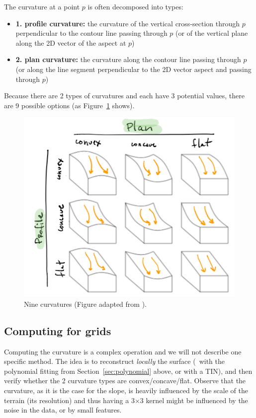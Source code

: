 The curvature at a point $p$ is often decomposed into types:
\begin{itemize}
  \item \textbf{1. profile curvature:} the curvature of the vertical cross-section through $p$ perpendicular to the contour line passing through $p$ (or of the vertical plane along the 2D vector of the aspect at $p$)
  \item \textbf{2. plan curvature:} the curvature along the contour line passing through $p$ (or along the line segment perpendicular to the 2D vector aspect and passing through $p$)
\end{itemize} 
Because there are 2 types of curvatures and each have 3 potential values, there are 9 possible options (as Figure~\ref{fig:curvatures} shows).
\begin{figure}
  \centering
  \includegraphics[width=0.9\linewidth]{figs/curvatures}
  \caption{Nine curvatures (Figure adapted from \citet{vanKreveld97}).}%
\label{fig:curvatures}
\end{figure}


\subsection{Computing for grids}

Computing the curvature is a complex operation and we will not describe one specific method.
The idea is to reconstruct \emph{locally} the surface (\eg\ with the polynomial fitting from Section~\ref{sec:polynomial} above, or with a TIN), and then verify whether the 2 curvature types are convex/concave/flat.
Observe that the curvature, as it is the case for the slope, is heavily influenced by the scale of the terrain (its resolution) and thus having a 3$\times$3 kernel might be influenced by the noise in the data, or by small features.


